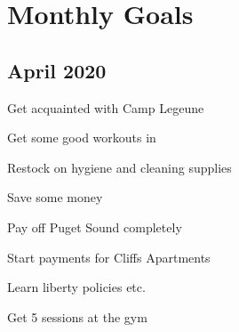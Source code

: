 \chapter{Monthly Goals}

\section{April 2020}

\begin{todolist}
\item Get acquainted with Camp Legeune
\item Get some good workouts in
\item Restock on hygiene and cleaning supplies
\item Save some money
\item Pay off Puget Sound completely
\item Start payments for Cliffs Apartments
\item Learn liberty policies etc.
\item Get 5 sessions at the gym
\end{todolist}
